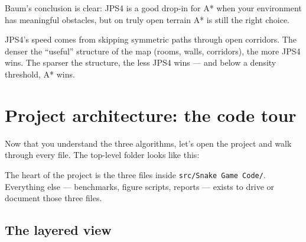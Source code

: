 \documentclass[11pt,a4paper]{article}
\begin{document}
Baum's conclusion is clear: JPS4 is a good drop-in for A* when your environment has meaningful obstacles, but on truly open terrain A* is still the right choice.

\begin{keybox}
JPS4's speed comes from skipping symmetric paths through open corridors. The denser the ``useful'' structure of the map (rooms, walls, corridors), the more JPS4 wins. The sparser the structure, the less JPS4 wins --- and below a density threshold, A* wins.
\end{keybox}

\clearpage
\section{Project architecture: the code tour}\label{sec:arch}

Now that you understand the three algorithms, let's open the project and walk through every file. The top-level folder looks like this:

\begin{center}
\end{center}

\noindent The heart of the project is the three files inside \texttt{src/Snake Game Code/}. Everything else --- benchmarks, figure scripts, reports --- exists to drive or document those three files.

\subsection{The layered view}
\end{document}
